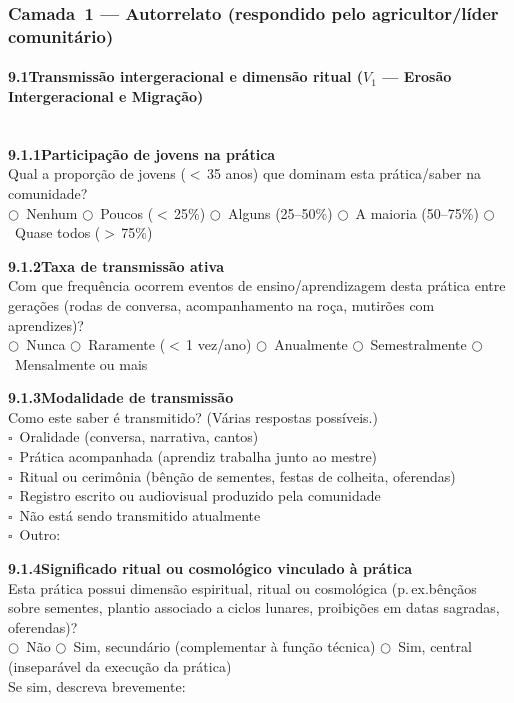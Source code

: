 \subsubsection*{Camada~1 --- Autorrelato (respondido pelo agricultor/líder comunitário)}

\paragraph{9.1\quad Transmissão intergeracional e dimensão ritual ($V_1$ --- Erosão Intergeracional e Migração)}~\\[4pt]

\noindent\textbf{9.1.1\quad Participação de jovens na prática}\\[2pt]
Qual a proporção de jovens ($<$\,35 anos) que dominam esta prática/saber na comunidade?\\
$\bigcirc$~Nenhum \quad $\bigcirc$~Poucos ($<$\,25\%) \quad $\bigcirc$~Alguns (25--50\%) \quad $\bigcirc$~A maioria (50--75\%) \quad $\bigcirc$~Quase todos ($>$\,75\%)

\medskip\noindent\textbf{9.1.2\quad Taxa de transmissão ativa}\\[2pt]
Com que frequência ocorrem eventos de ensino/aprendizagem desta prática entre gerações (rodas de conversa, acompanhamento na roça, mutirões com aprendizes)?\\
$\bigcirc$~Nunca \quad $\bigcirc$~Raramente ($<$\,1 vez/ano) \quad $\bigcirc$~Anualmente \quad $\bigcirc$~Semestralmente \quad $\bigcirc$~Mensalmente ou mais

\medskip\noindent\textbf{9.1.3\quad Modalidade de transmissão}\\[2pt]
Como este saber é transmitido? (Várias respostas possíveis.)\\
$\square$~Oralidade (conversa, narrativa, cantos)\\
$\square$~Prática acompanhada (aprendiz trabalha junto ao mestre)\\
$\square$~Ritual ou cerimônia (bênção de sementes, festas de colheita, oferendas)\\
$\square$~Registro escrito ou audiovisual produzido pela comunidade\\
$\square$~Não está sendo transmitido atualmente\\
$\square$~Outro: \dotfill

\medskip\noindent\textbf{9.1.4\quad Significado ritual ou cosmológico vinculado à prática}\\[2pt]
Esta prática possui dimensão espiritual, ritual ou cosmológica (p.\,ex.\@ bênçãos sobre sementes, plantio associado a ciclos lunares, proibições em datas sagradas, oferendas)?\\
$\bigcirc$~Não \quad $\bigcirc$~Sim, secundário (complementar à função técnica) \quad $\bigcirc$~Sim, central (inseparável da execução da prática)\\[2pt]
Se sim, descreva brevemente: \dotfill\\[2pt]\dotfill

